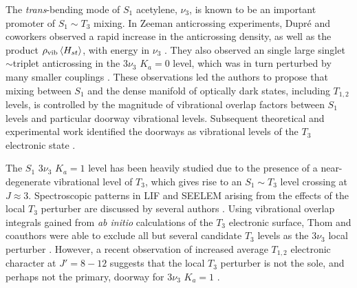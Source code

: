 \documentclass[12pt]{mitthesis}
\newcommand{\rcm}{cm$^{-1}$}
\newcommand{\Ka}[1]{$K_a\!\!=\!#1$}
\begin{document}

The \emph{trans}-bending mode of $S_1$ acetylene, $\nu_3$, is known to
be an important promoter of $S_1 \sim T_3$ mixing.  In Zeeman
anticrossing experiments, Dupr\'{e} and coworkers observed a rapid
increase in the anticrossing density, as well as the product
$\rho_{\text{vib}} \mathinner{\langle{H_{st}}\rangle}$, with energy in $\nu_3$
\cite{dupre91, dupre95b}.  They also observed an single large
singlet$\sim$triplet anticrossing in the $3 \nu_3$ $K_a=0$ level,
which was in turn perturbed by many smaller couplings \cite{dupre93}.
These observations led the authors to propose that mixing between
$S_1$ and the dense manifold of optically dark states, including
$T_{1,2}$ levels, is controlled by the magnitude of vibrational
overlap factors between $S_1$ levels and particular doorway
vibrational levels.  Subsequent theoretical and experimental work
identified the doorways as vibrational levels of the $T_3$ electronic
state \cite{vacek96, sherrill96, humphrey97, altunata00}.


The $S_1$ $3 \nu_3$ \Ka{1} level has been heavily studied due to the
presence of a near-degenerate vibrational level of $T_3$, which gives
rise to an $S_1 \sim T_3$ level crossing at $J \approx 3$.
Spectroscopic patterns in LIF and SEELEM arising from the effects of
the local $T_3$ perturber are discussed by several authors
\cite{humphrey97, altunata00, altunata01, mishra04}.  Using
vibrational overlap integrals gained from \emph{ab initio}
calculations of the $T_3$ electronic surface, Thom and coauthors were
able to exclude all but several candidate $T_3$ levels as the $3\nu_3$
local perturber \cite{thom07}.
However, a recent observation of increased average $T_{1,2}$
electronic character at $J'=8-12$ suggests that the local $T_3$
perturber is not the sole, and perhaps not the primary, doorway for $3
\nu_3$ \Ka{1} \cite{degroot07}.
\end{document}
